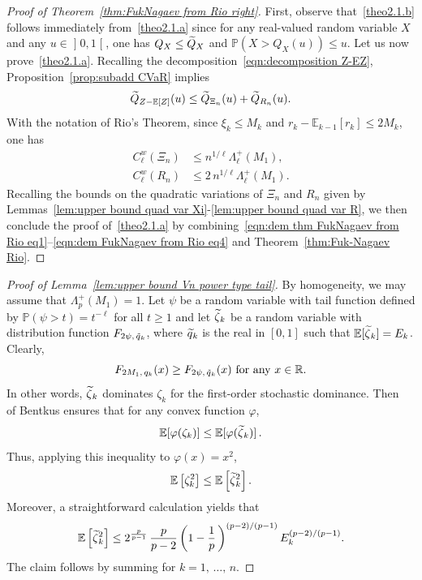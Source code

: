 \documentclass[10pt]{amsart}
\theoremstyle{definition}\newtheorem{defi}[theo]{Definition}\newtheorem{rema}[theo]{Remark}\newtheorem{exam}[theo]{Example}\newtheorem{exem}[theo]{Example}\newtheorem{nota}[theo]{Notation}
\newcommand{\bE}{\mathbb{E}}
\newcommand{\bP}{\mathbb{P}}
\newcommand{\bR}{\mathbb{R}}
\newcommand{\intervalleoo}[2]{\mathopen{]} #1\mathclose{}\mathpunct{},#2\mathclose{[}}
\let\oldtilde\tilde
\renewcommand*{\tilde}[1]{\mathchoice{\widetilde{#1}}{\widetilde{#1}}{\oldtilde{#1}}{\oldtilde{#1}}}
\begin{document}
\begin{proof}[Proof of Theorem~\ref{thm:FukNagaev from Rio right}]
First, observe that~\eqref{theo2.1.b} follows immediately from~\eqref{theo2.1.a} since for any real-valued random variable $X$ and any $u\in\intervalleoo 01$, one has $Q_X\leq \tilde Q_X$ and $\bP(X>Q_X(u))\leq u$. Let us now prove~\eqref{theo2.1.a}. Recalling the decomposition~\eqref{eqn:decomposition Z-EZ}, Proposition~\ref{prop:subadd CVaR} implies
\begin{equation}\label{eqn:dem thm FukNagaev from Rio eq1}
\tilde{Q}_{Z-\bE[Z]}(u)\leq \tilde{Q}_{\Xi_n}(u) + \tilde{Q}_{R_n}(u).
\end{equation}
With the notation of Rio's Theorem, since $\xi_k\leq M_k$ and $r_k-\bE_{k-1}[r_k]\leq 2M_k$, one has
\begin{align}
C_\ell^w(\Xi_n)&\leq n^{1/\ell}\Lambda_\ell^+(M_1),\label{eqn:dem FukNagaev from Rio eq3}
\\
C_\ell^w(R_n)&\leq 2\,n^{1/\ell}\Lambda_\ell^+(M_1).\label{eqn:dem FukNagaev from Rio eq4}
\end{align}
Recalling the bounds on the quadratic variations of $\Xi_n$ and $R_n$ given by Lemmas~\ref{lem:upper bound quad var Xi}-\ref{lem:upper bound quad var R}, we then conclude the proof of~\eqref{theo2.1.a} by combining~\eqref{eqn:dem thm FukNagaev from Rio eq1}--\eqref{eqn:dem FukNagaev from Rio eq4} and Theorem~\ref{thm:Fuk-Nagaev Rio}.
\end{proof}

\begin{proof}[Proof of Lemma~\ref{lem:upper bound Vn power type tail}]
By homogeneity, we may assume that $\Lambda_p^+(M_1)=1$. Let $\psi$ be a random variable with tail function defined by $\bP(\psi>t)=t^{-\ell}$ for all $t\geq 1$ and let $\tilde{\zeta}_k$ be a random variable with distribution function $F_{2\psi,\,\tilde{q}_k}$, where $\tilde q_k$ is the real in $[0,1]$ such that $\bE[\tilde{\zeta}_k]=E_k$. Clearly,
\[
F_{2M_1,\,q_k}(x)\geq F_{2\psi,\,\tilde{q}_k}(x)\text{ for any } x\in\bR.
\]
In other words, $\tilde \zeta_k$ dominates $\zeta_k$ for the first-order stochastic dominance. Then~\cite[Lemma~1]{Bentkus08a} of Bentkus ensures that for any convex function $\varphi$,
\begin{equation}
\bE[\varphi(\zeta_k)]\leq \bE[\varphi(\tilde\zeta_k)]\,.
\end{equation}
Thus, applying this inequality to $\varphi(x)= x^2$,
\begin{equation}\label{eqn:comparison xi tildexi}
\bE\left[\zeta_k^2\right]\leq \bE\left[\tilde\zeta_k^2\right].
\end{equation}
Moreover, a straightforward calculation yields that
\begin{equation}\label{eqn:bound tilde xi}
\bE\left[\tilde\zeta_k^2\right]\leq 2^{\frac{p}{p-1}}\,\frac{p}{p-2}\left(1-\frac{1}{p}\,\right)^{(p-2)/(p-1)}E_k^{(p-2)/(p-1)}.
\end{equation}
The claim follows by summing for $k=1,\,\ldots,\,n$.
\end{proof}
\end{document}
